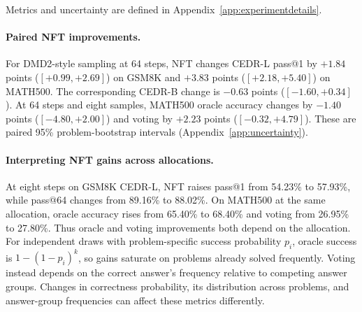 \documentclass[11pt,letterpaper]{article}
\begin{document}
Metrics and uncertainty are defined in Appendix~\ref{app:experimentdetails}.

\paragraph{Paired NFT improvements.}
For DMD2-style sampling at 64 steps, NFT changes CEDR-L pass@1 by $+1.84$ points ($[+0.99,+2.69]$) on GSM8K and $+3.83$ points ($[+2.18,+5.40]$) on MATH500. The corresponding CEDR-B change is $-0.63$ points ($[-1.60,+0.34]$). At 64 steps and eight samples, MATH500 oracle accuracy changes by $-1.40$ points ($[-4.80,+2.00]$) and voting by $+2.23$ points ($[-0.32,+4.79]$). These are paired 95\% problem-bootstrap intervals (Appendix~\ref{app:uncertainty}).

\paragraph{Interpreting NFT gains across allocations.}
At eight steps on GSM8K CEDR-L, NFT raises pass@1 from 54.23\% to 57.93\%, while pass@64 changes from 89.16\% to 88.02\%. On MATH500 at the same allocation, oracle accuracy rises from 65.40\% to 68.40\% and voting from 26.95\% to 27.80\%. Thus oracle and voting improvements both depend on the allocation. For independent draws with problem-specific success probability $p_i$, oracle success is $1-(1-p_i)^k$, so gains saturate on problems already solved frequently. Voting instead depends on the correct answer's frequency relative to competing answer groups. Changes in correctness probability, its distribution across problems, and answer-group frequencies can affect these metrics differently.
\end{document}
